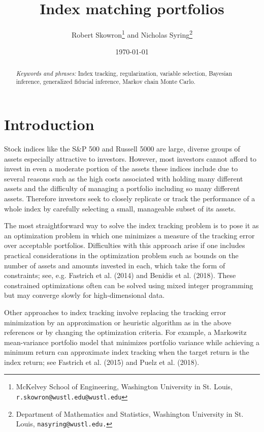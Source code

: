 \documentclass[a4paper, 12pt]{article}
\title{Index matching portfolios}
\author{Robert Skowron\footnote{McKelvey School of Engineering, Washington University in St. Louis, {\tt r.skowron@wustl.edu@wustl.edu}} \quad and \quad Nicholas Syring\footnote{Department of Mathematics and Statistics, Washington University in St. Louis,  {\tt nasyring@wustl.edu.}}}
\date{\today}
\theoremstyle{plain}
\theoremstyle{definition}
\theoremstyle{remark}
\begin{document}
\maketitle



\begin{abstract}



\smallskip

\emph{Keywords and phrases:} Index tracking, regularization, variable selection, Bayesian inference, generalized fiducial inference, Markov chain Monte Carlo.

\end{abstract}


\section{Introduction}
\label{S:intro}

Stock indices like the S\&P 500 and Russell 5000 are large, diverse groups of assets especially attractive to investors.  However, most investors cannot afford to invest in even a moderate portion of the assets these indices include due to several reasons such as the high costs associated with holding many different assets and the difficulty of managing a portfolio including so many different assets.  Therefore investors seek to closely replicate or track the performance of a whole index by carefully selecting a small, manageable subset of its assets. 

The most straightforward way to solve the index tracking problem is to pose it as an optimization problem in which one minimizes a measure of the tracking error over acceptable portfolios.  Difficulties with this approach arise if one includes practical considerations in the optimization problem such as bounds on the number of assets and amounts invested in each, which take the form of constraints; see, e.g. Fastrich et al. (2014) and Benidis et al. (2018).  These constrained optimizations often can be solved using mixed integer programming but may converge slowly for high-dimensional data.  

Other approaches to index tracking involve replacing the tracking error minimization by an approximation or heuristic algorithm as in the above references or by changing the optimization criteria.  For example, a Markowitz mean-variance portfolio model that minimizes portfolio variance while achieving a minimum return can approximate index tracking when the target return is the index return; see Fastrich et al. (2015) and Puelz et al. (2018).   
\end{document}
